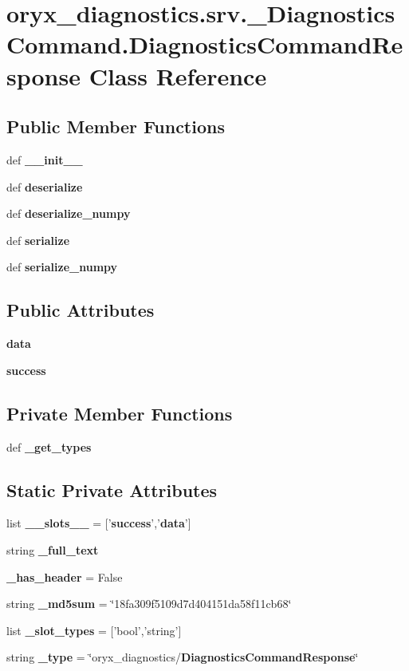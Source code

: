 \section{oryx\-\_\-diagnostics.\-srv.\-\_\-\-Diagnostics\-Command.\-Diagnostics\-Command\-Response \-Class \-Reference}
\label{classoryx__diagnostics_1_1srv_1_1__DiagnosticsCommand_1_1DiagnosticsCommandResponse}
\subsection*{\-Public \-Member \-Functions}
\begin{DoxyCompactItemize}
\item 
def {\bf \-\_\-\-\_\-init\-\_\-\-\_\-}
\item 
def {\bf deserialize}
\item 
def {\bf deserialize\-\_\-numpy}
\item 
def {\bf serialize}
\item 
def {\bf serialize\-\_\-numpy}
\end{DoxyCompactItemize}
\subsection*{\-Public \-Attributes}
\begin{DoxyCompactItemize}
\item 
{\bf data}
\item 
{\bf success}
\end{DoxyCompactItemize}
\subsection*{\-Private \-Member \-Functions}
\begin{DoxyCompactItemize}
\item 
def {\bf \-\_\-get\-\_\-types}
\end{DoxyCompactItemize}
\subsection*{\-Static \-Private \-Attributes}
\begin{DoxyCompactItemize}
\item 
list {\bf \-\_\-\-\_\-slots\-\_\-\-\_\-} = ['{\bf success}','{\bf data}']
\item 
string {\bf \-\_\-full\-\_\-text}
\item 
{\bf \-\_\-has\-\_\-header} = \-False
\item 
string {\bf \-\_\-md5sum} = \char`\"{}18fa309f5109d7d404151da58f11cb68\char`\"{}
\item 
list {\bf \-\_\-slot\-\_\-types} = ['bool','string']
\item 
string {\bf \-\_\-type} = \char`\"{}oryx\-\_\-diagnostics/{\bf \-Diagnostics\-Command\-Response}\char`\"{}
\end{DoxyCompactItemize}


